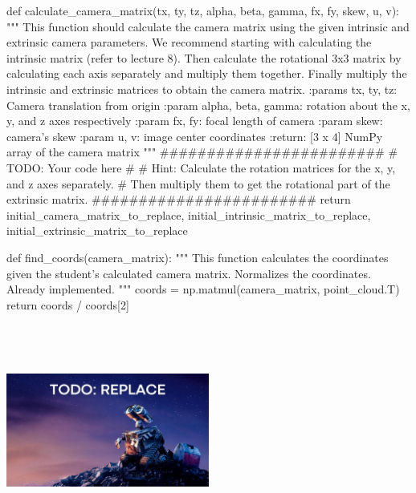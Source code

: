 \begin{enumerate}[(a)]
\begin{tcolorbox}[enhanced jigsaw,breakable,pad at break*=1mm,colback=white!5!white,colframe=green!75!black,height fixed for=all]
\begin{python}
def calculate_camera_matrix(tx, ty, tz, alpha, beta, gamma, fx, fy, skew, u, v):
    """
    This function should calculate the camera matrix using the given
    intrinsic and extrinsic camera parameters.
    We recommend starting with calculating the intrinsic matrix (refer to lecture 8).
    Then calculate the rotational 3x3 matrix by calculating each axis separately and
    multiply them together.
    Finally multiply the intrinsic and extrinsic matrices to obtain the camera matrix.
    :params tx, ty, tz: Camera translation from origin
    :param alpha, beta, gamma: rotation about the x, y, and z axes respectively
    :param fx, fy: focal length of camera
    :param skew: camera's skew
    :param u, v: image center coordinates
    :return: [3 x 4] NumPy array of the camera matrix
    """
    ########################
    # TODO: Your code here #
    # Hint: Calculate the rotation matrices for the x, y, and z axes separately.
    # Then multiply them to get the rotational part of the extrinsic matrix.
    ########################
    return initial_camera_matrix_to_replace, initial_intrinsic_matrix_to_replace, initial_extrinsic_matrix_to_replace

def find_coords(camera_matrix):
    """
    This function calculates the coordinates given the student's calculated camera matrix.
    Normalizes the coordinates.
    Already implemented.
    """
    coords = np.matmul(camera_matrix, point_cloud.T)
    return coords / coords[2]
    \end{python}
\end{tcolorbox}

\begin{tcolorbox}[colback=white!5!white,colframe=green!75!black]
    \includegraphics[width=0.5\textwidth,height=7cm,keepaspectratio]{images/TODO wall-e.jpg}
\end{tcolorbox}



\end{enumerate}
